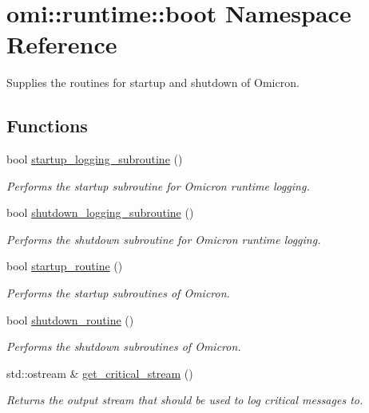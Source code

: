 \hypertarget{namespaceomi_1_1runtime_1_1boot}{}\section{omi\+:\+:runtime\+:\+:boot Namespace Reference}
\label{namespaceomi_1_1runtime_1_1boot}


Supplies the routines for startup and shutdown of Omicron.  


\subsection*{Functions}
\begin{DoxyCompactItemize}
\item 
bool \hyperlink{namespaceomi_1_1runtime_1_1boot_ae5727a38c5b2a13151d32cc9bc8d6989}{startup\+\_\+logging\+\_\+subroutine} ()
\begin{DoxyCompactList}\small\item\em Performs the startup subroutine for Omicron runtime logging. \end{DoxyCompactList}\item 
bool \hyperlink{namespaceomi_1_1runtime_1_1boot_aaa8fe999da953495d7cfaba35c1e6fe6}{shutdown\+\_\+logging\+\_\+subroutine} ()
\begin{DoxyCompactList}\small\item\em Performs the shutdown subroutine for Omicron runtime logging. \end{DoxyCompactList}\item 
bool \hyperlink{namespaceomi_1_1runtime_1_1boot_a91590fccb2aaf380d4fee8613334b84c}{startup\+\_\+routine} ()
\begin{DoxyCompactList}\small\item\em Performs the startup subroutines of Omicron. \end{DoxyCompactList}\item 
bool \hyperlink{namespaceomi_1_1runtime_1_1boot_a0b84d982ce5c250bc76b6aa05a574785}{shutdown\+\_\+routine} ()
\begin{DoxyCompactList}\small\item\em Performs the shutdown subroutines of Omicron. \end{DoxyCompactList}\item 
std\+::ostream \& \hyperlink{namespaceomi_1_1runtime_1_1boot_ad16d09079350024024106889c66ae886}{get\+\_\+critical\+\_\+stream} ()
\begin{DoxyCompactList}\small\item\em Returns the output stream that should be used to log critical messages to. \end{DoxyCompactList}\end{DoxyCompactItemize}


